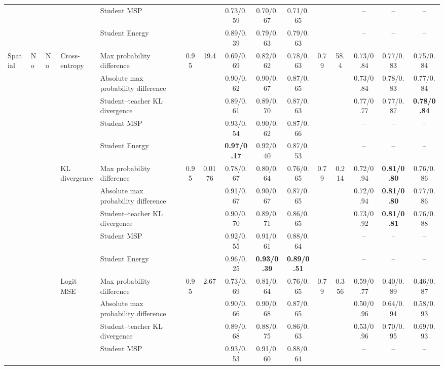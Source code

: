 \documentclass[border=2pt]{standalone}
\begin{document}
\begin{tabular}{lllllcccccccccc}
 &  &  &  & Student MSP &  &  & 0.73/0.59 & 0.70/0.67 & 0.71/0.65 &  &  & -- & -- & -- \\
 &  &  &  & Student Energy &  &  & 0.89/0.39 & 0.79/0.63 & 0.79/0.63 &  &  & -- & -- & -- \\
\addlinespace
Spatial & No & No & Cross-entropy & Max probability difference & 0.95 & 19.4 & 0.69/0.69 & 0.82/0.62 & 0.78/0.63 & 0.79 & 58.4 & 0.73/0.84 & 0.77/0.83 & 0.75/0.84 \\
 &  &  &  & Absolute max probability difference &  &  & 0.90/0.62 & 0.90/0.67 & 0.87/0.65 &  &  & 0.73/0.84 & 0.78/0.83 & 0.77/0.84 \\
 &  &  &  & Student--teacher KL divergence &  &  & 0.89/0.61 & 0.89/0.70 & 0.87/0.63 &  &  & 0.77/0.77 & 0.77/0.87 & \textbf{0.78/0.84} \\
 &  &  &  & Student MSP &  &  & 0.93/0.54 & 0.90/0.62 & 0.87/0.66 &  &  & -- & -- & -- \\
 &  &  &  & Student Energy &  &  & \textbf{0.97/0.17} & 0.92/0.40 & 0.87/0.53 &  &  & -- & -- & -- \\
 &  &  & KL divergence & Max probability difference & 0.95 & 0.0176 & 0.78/0.67 & 0.80/0.64 & 0.76/0.65 & 0.79 & 0.214 & 0.72/0.94 & \textbf{0.81/0.80} & 0.76/0.86 \\
 &  &  &  & Absolute max probability difference &  &  & 0.91/0.67 & 0.90/0.67 & 0.87/0.65 &  &  & 0.72/0.94 & \textbf{0.81/0.80} & 0.77/0.86 \\
 &  &  &  & Student--teacher KL divergence &  &  & 0.90/0.70 & 0.89/0.71 & 0.86/0.65 &  &  & 0.73/0.92 & \textbf{0.81/0.81} & 0.76/0.88 \\
 &  &  &  & Student MSP &  &  & 0.92/0.55 & 0.91/0.61 & 0.88/0.64 &  &  & -- & -- & -- \\
 &  &  &  & Student Energy &  &  & 0.96/0.25 & \textbf{0.93/0.39} & \textbf{0.89/0.51} &  &  & -- & -- & -- \\
 &  &  & Logit MSE & Max probability difference & 0.95 & 2.67 & 0.73/0.69 & 0.81/0.64 & 0.76/0.65 & 0.79 & 0.356 & 0.59/0.77 & 0.40/0.89 & 0.46/0.87 \\
 &  &  &  & Absolute max probability difference &  &  & 0.90/0.66 & 0.90/0.68 & 0.87/0.65 &  &  & 0.50/0.96 & 0.64/0.94 & 0.58/0.93 \\
 &  &  &  & Student--teacher KL divergence &  &  & 0.89/0.68 & 0.88/0.75 & 0.86/0.63 &  &  & 0.53/0.96 & 0.70/0.95 & 0.69/0.93 \\
 &  &  &  & Student MSP &  &  & 0.93/0.53 & 0.91/0.60 & 0.88/0.64 &  &  & -- & -- & -- \\

\end{tabular}
\end{document}
